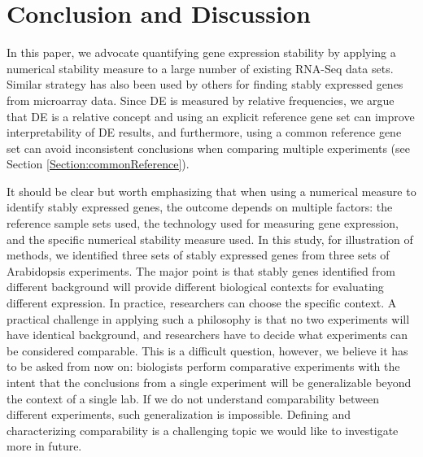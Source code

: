 \documentclass[letterpaper,12pt]{article}
\begin{document}
  \section{Conclusion and Discussion}\label{section:discussion}
In this paper, we advocate quantifying gene expression stability by applying a
numerical stability measure to a large number of existing RNA-Seq data sets.
Similar strategy has also been used by others for finding stably expressed
genes from microarray data. Since DE is measured by relative frequencies, we
argue that DE is a relative concept and using an explicit reference gene set
can improve interpretability of DE results, and furthermore,  using a common
reference gene set can avoid inconsistent conclusions when comparing multiple
experiments (see Section \ref{Section:commonReference}).



It should be clear but worth emphasizing that when using a numerical measure
to identify stably expressed genes, the outcome depends on multiple factors:
the reference sample sets used, the technology used for measuring gene
expression, and the specific numerical stability measure used.  In this study,
for illustration of methods, we identified three sets of stably expressed
genes from three sets of Arabidopsis experiments. The major point is that
stably genes identified from different background will provide different
biological contexts for evaluating different expression. In practice,
researchers can choose the specific context. A practical challenge in applying
such a philosophy is that no two experiments will have identical background,
and researchers have to decide what experiments can be considered comparable. This
is a difficult question, however, we believe it has to be asked from now on:
biologists perform comparative experiments with the intent that the
conclusions from a single experiment will be generalizable beyond the context
of a single lab. If we do not understand comparability between different
experiments, such generalization is impossible. Defining and characterizing
comparability is a challenging topic we would like to investigate more in
future.
\end{document}
